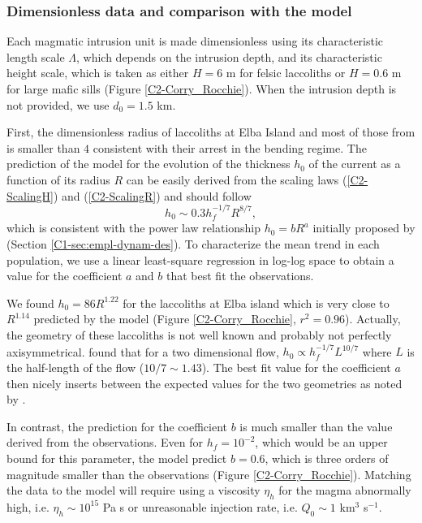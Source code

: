 \subsubsection*{Dimensionless data and comparison with the model}

Each  magmatic   intrusion  unit  is  made   dimensionless  using  its
characteristic  length   scale  $\Lambda$,  which  depends on  the
intrusion depth, and  its characteristic height scale,  which is taken
as either $H=6$  m for felsic laccoliths or $H=0.6$  m for large mafic
sills (Figure \ref{C2-Corry_Rocchie}). When the intrusion depth is not
provided, we use $d_0=1.5$ km. 

First, the dimensionless radius of  laccoliths at Elba Island and most
of those  from \citet{E:2015tl}  is smaller  than $4$  consistent with
their arrest in  the bending regime.  The prediction of  the model for
the evolution of  the thickness $h_0$ of the current  as a function of
its  radius  $R$   can  be  easily  derived  from   the  scaling  laws
(\ref{C2-ScalingH}) and (\ref{C2-ScalingR}) and should follow
\begin{equation}
  h_0 \sim 0.3h_f^{-1/7} R^{8/7}\label{C2-Hr},
\end{equation}
which  is consistent  with the  power  law relationship  $h_0 =  bR^a$
initially     proposed     by    \citet{McCaffrey:1997ea}     (Section
\ref{C1-sec:empl-dynam-des}). To  characterize the mean trend  in each
population, we use  a linear least-square regression  in log-log space
to obtain a  value for the coefficient  $a$ and $b$ that  best fit the
observations.  

We found $h_0  = 86 R^{1.22}$ for the laccoliths  at Elba island which
is  very   close  to  $R^{1.14}$   predicted  by  the   model  (Figure
\ref{C2-Corry_Rocchie}, $r^2=0.96$).  Actually,  the geometry of these
laccoliths   is   not   well   known  and   probably   not   perfectly
axisymmetrical.   \citet{Anonymous:QWXp_4JV}  found  that  for  a  two
dimensional  flow, $h_0\propto  h_f^{-1/7}L^{10/7}$ where  $L$ is  the
half-length of the flow ($10/7\sim 1.43$).  The best fit value for the
coefficient $a$  then nicely inserts  between the expected  values for
the two geometries as noted by \citet{Michaut:2011kg}.  

In contrast,  the prediction for  the coefficient $b$ is  much smaller
than the value derived from the observations.  Even for $h_f=10^{-2}$,
which would  be an upper bound  for this parameter, the  model predict
$b=0.6$,  which  is  three  orders  of  magnitude  smaller  than  the
observations  (Figure \ref{C2-Corry_Rocchie}).   Matching the  data to
the  model will  require  using  a viscosity  $\eta_h$  for the  magma
abnormally  high, i.e.   $\eta_h \sim  10^{15}$ Pa  s or  unreasonable
injection rate, i.e. $Q_0\sim 1$ km$^3$ s$^{-1}$.


